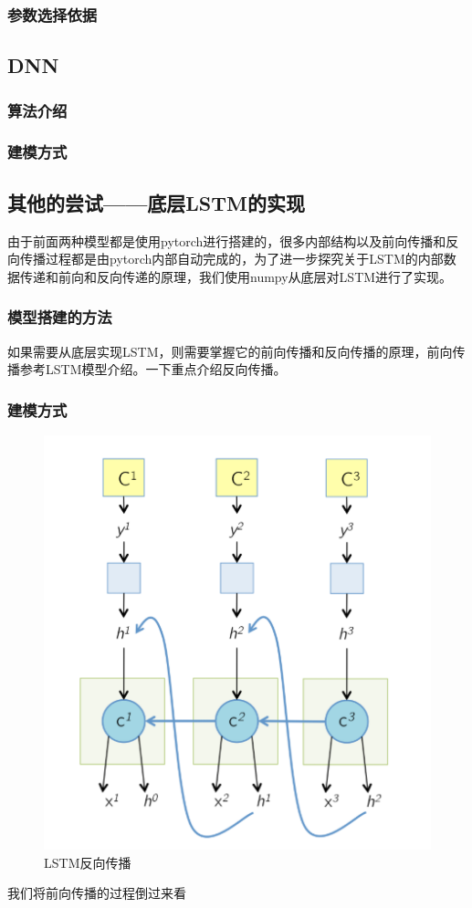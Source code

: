 \documentclass[UTF8]{ctexart}
\begin{document}
\subsubsection{参数选择依据}
\subsection{DNN}
\subsubsection{算法介绍}
\subsubsection{建模方式}
\subsection{其他的尝试——底层LSTM的实现}
由于前面两种模型都是使用pytorch进行搭建的，很多内部结构以及前向传播和反向传播过程都是由pytorch内部自动完成的，为了进一步探究关于LSTM的内部数据传递和前向和反向传递的原理，我们使用numpy从底层对LSTM进行了实现。
\subsubsection{模型搭建的方法}
如果需要从底层实现LSTM，则需要掌握它的前向传播和反向传播的原理，前向传播参考LSTM模型介绍。一下重点介绍反向传播。
\subsubsection{建模方式}
\begin{figure}[!htbp]
    \centering
    \includegraphics[scale = 0.6]{p7.png}
    \caption{LSTM反向传播\cite{3}}
\end{figure}
我们将前向传播的过程倒过来看
\end{document}
